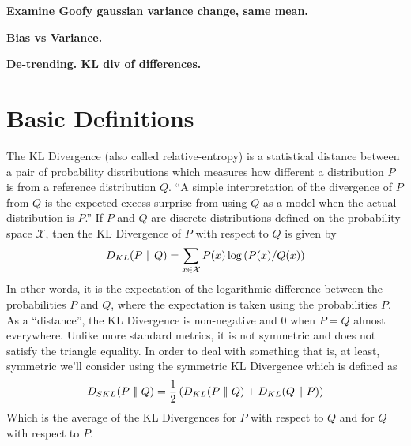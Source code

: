 \textbf{Examine Goofy gaussian variance change, same mean.}

\textbf{Bias vs Variance.}

\textbf{De-trending. KL div of differences.}


\section{Basic Definitions}
The KL Divergence (also called relative-entropy) is a statistical distance between a 
pair of probability distributions which measures how different a distribution $P$ is 
from a reference distribution $Q$. ``A simple interpretation of the 
divergence of $P$ from $Q$ is the expected excess surprise from using $Q$ as a model 
when the actual distribution is $P$.'' If $P$ and $Q$ are discrete distributions 
defined on the probability space $\mathcal{X}$, then the KL Divergence of $P$ with 
respect to $Q$ is given by
$$D_{KL}(P\ |\!|\ Q) = \sum_{x \in \mathcal{X}}P(x)\log\left(P(x)/Q(x)\right)$$
In other words, it is the expectation of the logarithmic difference between the 
probabilities $P$ and $Q$, where the expectation is taken using the probabilities 
$P$. As a ``distance'', the KL Divergence is non-negative and 0 when $P = Q$ almost
everywhere. Unlike more standard metrics, it is not symmetric and does not satisfy 
the triangle equality. In order to deal with something that is, at least, symmetric 
we'll consider using the symmetric KL Divergence which is defined as 
$$D_{SKL}(P\ |\!|\ Q) = \frac{1}{2}\parens{D_{KL}(P\ |\!|\ Q) + D_{KL}(Q\ |\!|\ P)}$$
Which is the average of the KL Divergences for $P$ with respect to $Q$ and for $Q$
with respect to $P$.

